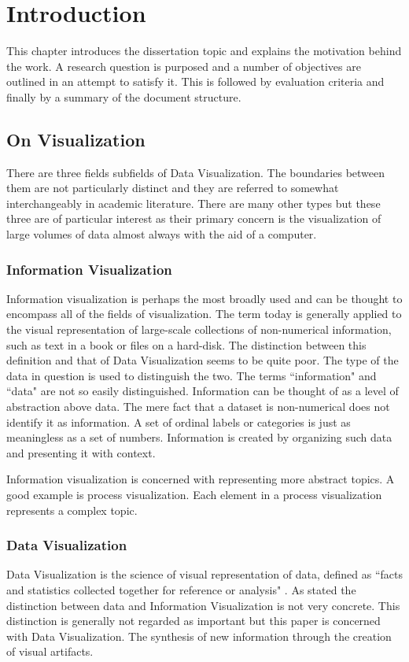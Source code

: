 \documentclass[a4paper, 11pt, titlepage, onehalfspacing]{report}
\begin{document}
\tableofcontents
\clearpage

\newpage
 
\chapter{Introduction} 
This chapter introduces the dissertation topic and explains the motivation behind the work. A research question is purposed and a number of objectives are outlined in an attempt to satisfy it. This is followed by evaluation criteria and finally by a summary of the document structure.

\section{On Visualization}
There are three fields subfields of Data Visualization. The boundaries between them are not particularly distinct and they are referred to somewhat interchangeably in academic literature. There are many other types but these three are of particular interest as their primary concern is the visualization of large volumes of data almost always with the aid of a computer.
\subsection{Information Visualization}
Information visualization is perhaps the most broadly used and can be thought to encompass all of the fields of visualization. The term today is generally applied to the visual representation of large-scale collections of non-numerical information, such as text in a book or files on a hard-disk. The distinction between this definition and that of Data Visualization seems to be quite poor. The type of the data in question is used to distinguish the two. The terms ``information" and ``data" are not so easily distinguished. Information can be thought of as a level of abstraction above data. The mere fact that a dataset is non-numerical does not identify it as information. A set of ordinal labels or categories is just as meaningless as a set of numbers. Information is created by organizing such data and presenting it with context.

Information visualization is concerned with representing more abstract topics. A good example is process visualization. Each element in a process visualization represents a complex topic.

\subsection{Data Visualization}
Data Visualization is the science of visual representation of data, defined as ``facts and statistics collected together for reference or analysis" \cite{oed31}. As stated the distinction between data and Information Visualization is not very concrete. This distinction is generally not regarded as important but this paper is concerned with Data Visualization. The synthesis of new information through the creation of visual artifacts.
\end{document}
